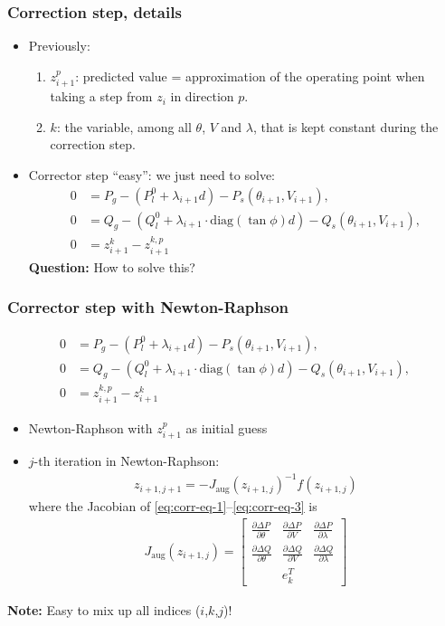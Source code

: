 \documentclass{beamer}
\begin{document}
\begin{frame}
  \frametitle{Correction step, details}
  \begin{itemize}
  \item Previously:
    \begin{enumerate}
    \item $z_{i+1}^p$: predicted value = approximation of the operating point when taking a step from $z_i$ in direction $p$.
    \item $k$: the variable, among all $\theta$, $V$ and $\lambda$, that is kept constant during the correction step.
    \end{enumerate}
  \item Corrector step ``easy'': we just need to solve:
\begin{align}
      0 &= P_g - (P_l^0 + \lambda_{i+1} d) - P_s(\theta_{i+1},V_{i+1}),\\
      0 &= Q_g - (Q_l^0 + \lambda_{i+1} \cdot \text{diag}(\tan \phi) d)- Q_s(\theta_{i+1},V_{i+1}), \\
      0 &= z_{i+1}^{k}-z_{i+1}^{k,p}
\end{align}
\textbf{Question:} How to solve this? 
  \end{itemize}
\end{frame}

\begin{frame}
  \frametitle{Corrector step with Newton-Raphson}
\begin{align}
      0 &= P_g - (P_l^0 + \lambda_{i+1} d) - P_s(\theta_{i+1},V_{i+1}), \label{eq:corr-eq-1}\\
      0 &= Q_g - (Q_l^0 + \lambda_{i+1} \cdot \text{diag}(\tan \phi) d)- Q_s(\theta_{i+1},V_{i+1}), \\
      0 &= z_{i+1}^{k,p} - z_{i+1}^{k} \label{eq:corr-eq-3}
\end{align}
\begin{itemize}
\item Newton-Raphson with $z_{i+1}^p$ as initial guess
\item $j$-th iteration in Newton-Raphson:
\begin{align}
  \label{eq:3}
  z_{i+1,j+1} = - J_\text{aug}(z_{i+1,j})^{-1} f(z_{i+1,j})
\end{align}
where the Jacobian of \eqref{eq:corr-eq-1}--\eqref{eq:corr-eq-3} is
\begin{align}
  \label{eq:8}
  J_\text{aug}(z_{i+1,j}) = \begin{bmatrix}
  \frac{\partial \Delta P}{\partial \theta} & \frac{\partial \Delta P}{\partial V} & \frac{\partial \Delta P}{\partial \lambda} \\
  \frac{\partial \Delta Q}{\partial \theta} & \frac{\partial \Delta Q}{\partial V} & \frac{\partial \Delta Q}{\partial \lambda} \\
   & e_k^T & 
  \end{bmatrix}
\end{align}
\end{itemize}
\textbf{Note:} Easy to mix up all indices ($i$,$k$,$j$)!
\end{frame}
\end{document}
